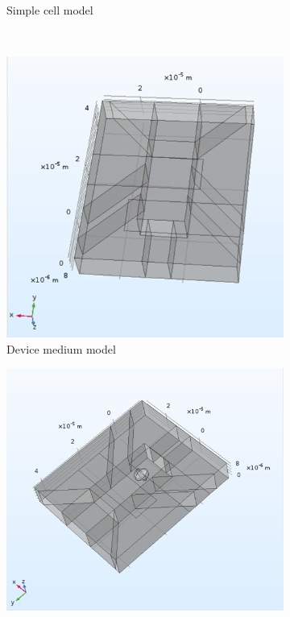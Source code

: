 \begin{figure}[h]
\begin{subfigure}[b]{0.45\textwidth}
        \caption{Simple cell model}
        \label{fig:simple_medium_with_cell_fea_model}
    \end{subfigure}
    \\ \vspace{0.3 in}
    \begin{subfigure}[b]{0.45\textwidth}
        \centering
        \includegraphics[width=\textwidth]{images/deviceMediumGeometry.png}
        \caption{Device medium model}
        \label{fig:device_medium_fea_model}
    \end{subfigure}
    \hfill
    \begin{subfigure}[b]{0.45\textwidth}
        \centering
        \includegraphics[width=\textwidth]{images/deviceCellGeometry.png}

\end{subfigure}
\end{figure}
